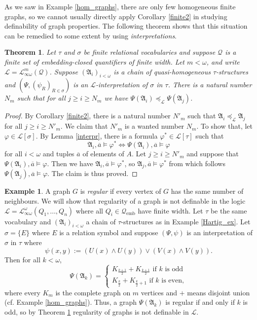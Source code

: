 \documentclass{ndjflart}
\theoremstyle{plain}
\newtheorem{theorem}[conjecture]{Theorem}
\theoremstyle{definition}
\newtheorem{example}[conjecture]{Example}
\numberwithin{equation}{section}
\DeclareMathOperator{\emb}{emb}
\begin{document}
As we saw in Example \ref{hom_graphs}, there are only few homogeneous finite graphs,
so we cannot usually directly apply Corollary \ref{finite2} in studying definability
of graph properties.
The following theorem shows that this situation can be remedied to some extent by using \emph{interpretations}.

\begin{theorem}\label{inter}
Let $\tau$ and $\sigma$ be finite relational vocabularies and suppose $\mathcal{Q}$ is a finite set of embedding-closed quantifiers of finite width.
Let $m < \omega$, and write $\mathcal{L} = \mathcal{L}^m_{\infty\omega}(\mathcal{Q})$.
Suppose $(\mathfrak{A}_i)_{i<\omega}$ is a chain of quasi-homogeneous $\tau$-structures and
$(\Psi,(\psi_R)_{R\in\sigma})$ is an $\mathcal{L}$-interpretation of $\sigma$ in $\tau$.
There is a natural number $N_m$ such that for all $j \geq i \geq N_m$ we have $\Psi(\mathfrak{A}_i) \preceq_{\mathcal{L}} \Psi(\mathfrak{A}_j)$.
\end{theorem}
\begin{proof}
By Corollary \ref{finite2}, there is a natural number $N'_m$ such that $\mathfrak{A}_i \preceq_{\mathcal{L}} \mathfrak{A}_j$ for all $j\geq i \geq N'_m$.
We claim that $N'_m$ is a wanted number $N_m$.
To show that, let $\varphi \in \mathcal{L}[\sigma]$.
By Lemma \ref{interpr}, there is a formula $\varphi^* \in \mathcal{L}[\tau]$ such that
\[
	\mathfrak{A}_i, \overline{a} \vDash \varphi^* \Leftrightarrow \Psi(\mathfrak{A}_i), \overline{a} \vDash \varphi
\]
for all $i<\omega$ and tuples $\overline{a}$ of elements of $A$.
Let $j \geq i \geq N'_m$ and suppose that $\Psi(\mathfrak{A}_i),\overline{a} \vDash \varphi$.
Then we have $\mathfrak{A}_i,\overline{a} \vDash \varphi^*$, so $\mathfrak{A}_j, \overline{a} \vDash \varphi^*$ from which follows $\Psi(\mathfrak{A}_j), \overline{a} \vDash \varphi$. The claim is thus proved.
\end{proof}

\begin{example}
A graph $G$ is \emph{regular} if every vertex of $G$ has the same number of neighbours.
We will show that regularity of a graph is not definable in the logic $\mathcal{L} = \mathcal{L}^{\omega}_{\infty \omega}(Q_1,\dots,Q_n)$ where all $Q_i \in \mathcal{Q}_{\emb}$ have finite width.
Let $\tau$ be the same vocabulary and $(\mathfrak{A}_i)_{i<\omega}$ a chain of $\tau$-structures as in Example \ref{Hartig_ex}.
Let $\sigma = \{E\}$ where $E$ is a relation symbol and suppose
$(\Psi,\psi)$ is an interpretation of $\sigma$ in $\tau$ where
\[
	\psi(x,y) := (U(x)\wedge U(y)) \vee (V(x) \wedge V(y)).
\]
Then for all $k<\omega$,
\[
	\Psi(\mathfrak{A}_k) = \begin{cases}
	K_{\frac{k+1}{2}} + K_{\frac{k+1}{2}} \text{ if } k \text{ is odd} \\
	K_{\frac{k}{2}} + K_{\frac{k}{2}+1} \text{ if } k \text{ is even},
	\end{cases}
\]
where every $K_m$ is the complete graph on $m$ vertices and $+$ means disjoint union (cf. Example \ref{hom_graphs}).
Thus, a graph $\Psi(\mathfrak{A}_k)$ is regular if and only if $k$ is odd,
so by Theorem \ref{inter} regularity of graphs is not definable in $\mathcal{L}$.
\end{example}
\end{document}
